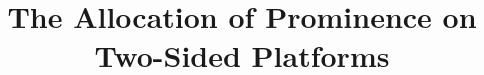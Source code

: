\documentclass[11pt]{article}
\begin{document}
\title{The Allocation of Prominence on Two-Sided Platforms}



\maketitle












\end{document}
